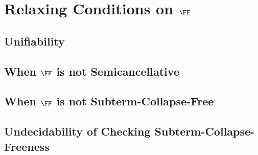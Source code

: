 \chapter{Relaxing Conditions on \texorpdfstring{$\FF$}{F}}\label{chap:relax-cond-h}

\section{Unifiability}\label{sec:unifiability}

\section{When \texorpdfstring{$\FF$}{F} is not Semicancellative}\label{sec:h-not-semicancel}

\section{When \texorpdfstring{$\FF$}{F} is not Subterm-Collapse-Free}\label{sec:h-not-scf}

\section{Undecidability of Checking Subterm-Collapse-Freeness}\label{sec:undec-scf}

